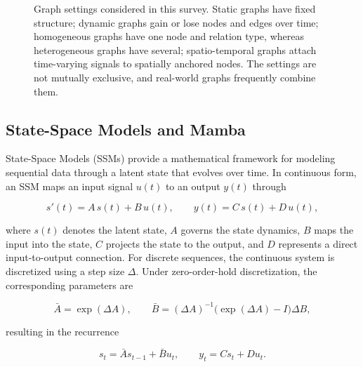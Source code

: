 \documentclass[acmsmall]{acmart}
\begin{document}
\begin{figure}[h]
    \centering
    \resizebox{0.9\textwidth}{!}{%
        
    }
    \caption{Graph settings considered in this survey. Static graphs have fixed structure; dynamic graphs gain or lose nodes and edges over time; homogeneous graphs have one node and relation type, whereas heterogeneous graphs have several; spatio-temporal graphs attach time-varying signals to spatially anchored nodes. The settings are not mutually exclusive, and real-world graphs frequently combine them.}
    \label{fig:graph-types}
\end{figure}

\subsection{State-Space Models and Mamba}
\label{sec:ssm-background}

State-Space Models (SSMs) provide a mathematical framework for modeling
sequential data through a latent state that evolves over time. In continuous
form, an SSM maps an input signal $u(t)$ to an output $y(t)$ through



\begin{equation}
s'(t)=A\,s(t)+B\,u(t),\qquad y(t)=C\,s(t)+D\,u(t),
\label{eq:ssm-continuous}
\end{equation}

where $s(t)$ denotes the latent state, $A$ governs the state dynamics,
$B$ maps the input into the state, $C$ projects the state to the output,
and $D$ represents a direct input-to-output connection. For discrete
sequences, the continuous system is discretized using a step size $\Delta$.
Under zero-order-hold discretization, the corresponding parameters are

\begin{equation}
\bar A=\exp(\Delta A),\qquad \bar B=(\Delta A)^{-1}\big(\exp(\Delta A)-I\big)\Delta B,
\label{eq:zoh-A}
\end{equation}


resulting in the recurrence

\begin{equation}
s_t=\bar{A}s_{t-1}+\bar{B}u_t,
\qquad
y_t=C s_t+D u_t.
\label{eq:ssm-recurrence}
\end{equation}
\end{document}
